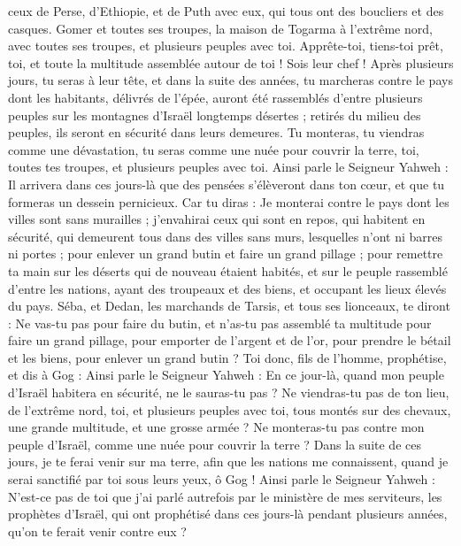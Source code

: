 \begin{multicols}{2}
ceux de Perse, d'Ethiopie, et de Puth avec eux, qui tous ont des boucliers et des casques.
Gomer et toutes ses troupes, la maison de Togarma à l'extrême nord, avec toutes ses troupes, et plusieurs peuples avec toi.
Apprête-toi, tiens-toi prêt, toi, et toute la multitude assemblée autour de toi ! Sois leur chef !
Après plusieurs jours, tu seras à leur tête, et dans la suite des années, tu marcheras contre le pays dont les habitants, délivrés de l'épée, auront été rassemblés d'entre plusieurs peuples sur les montagnes d'Israël longtemps désertes ; retirés du milieu des peuples, ils seront en sécurité dans leurs demeures.
Tu monteras, tu viendras comme une dévastation, tu seras comme une nuée pour couvrir la terre, toi, toutes tes troupes, et plusieurs peuples avec toi.
Ainsi parle le Seigneur Yahweh : Il arrivera dans ces jours-là que des pensées s'élèveront dans ton cœur, et que tu formeras un dessein pernicieux.
Car tu diras : Je monterai contre le pays dont les villes sont sans murailles ; j'envahirai ceux qui sont en repos, qui habitent en sécurité, qui demeurent tous dans des villes sans murs, lesquelles n'ont ni barres ni portes ;
pour enlever un grand butin et faire un grand pillage ; pour remettre ta main sur les déserts qui de nouveau étaient habités, et sur le peuple rassemblé d'entre les nations, ayant des troupeaux et des biens, et occupant les lieux élevés du pays.
Séba, et Dedan, les marchands de Tarsis, et tous ses lionceaux, te diront : Ne vas-tu pas pour faire du butin, et n'as-tu pas assemblé ta multitude pour faire un grand pillage, pour emporter de l'argent et de l'or, pour prendre le bétail et les biens, pour enlever un grand butin ?
Toi donc, fils de l'homme, prophétise, et dis à Gog : Ainsi parle le Seigneur Yahweh : En ce jour-là, quand mon peuple d'Israël habitera en sécurité, ne le sauras-tu pas ?
Ne viendras-tu pas de ton lieu, de l'extrême nord, toi, et plusieurs peuples avec toi, tous montés sur des chevaux, une grande multitude, et une grosse armée ?
Ne monteras-tu pas contre mon peuple d'Israël, comme une nuée pour couvrir la terre ? Dans la suite de ces jours, je te ferai venir sur ma terre, afin que les nations me connaissent, quand je serai sanctifié par toi sous leurs yeux, ô Gog !
Ainsi parle le Seigneur Yahweh : N'est-ce pas de toi que j'ai parlé autrefois par le ministère de mes serviteurs, les prophètes d'Israël, qui ont prophétisé dans ces jours-là pendant plusieurs années, qu'on te ferait venir contre eux ?

\end{multicols}
